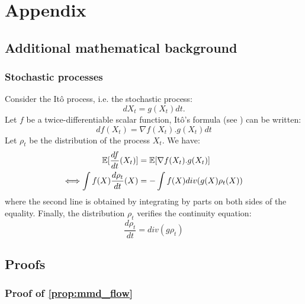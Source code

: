 \section{Appendix}\label{sec:appendix}

\subsection{Additional mathematical background}



\subsubsection{Stochastic processes}\label{sec:ito_stochastic}

Consider the Itô process, i.e. the stochastic process:
\begin{equation}
dX_t=g(X_t)dt.
\end{equation}
Let $f$ be a twice-differentiable scalar function, Itô's formula (see \cite{ito1951stochastic}) can be written:
\begin{equation}
df(X_t)=\nabla f(X_t).g(X_t)dt
\end{equation}
Let $\rho_t$ be the distribution of the process $X_t$. We have:
\begin{align}
{{\mathbb E}}[\frac{df}{dt}(X_t)]&= {{\mathbb E}}[\nabla f(X_t).g(X_t)]\\
\Longleftrightarrow \int f(X) \frac{d \rho_t}{dt}(X)&=-\int f(X)div(g(X)\rho_t(X))
\end{align}
where the second line is obtained by integrating by parts on both sides of the equality. Finally, the distribution $\rho_t$ verifies the continuity equation: 
\begin{equation}
\frac{d\rho_t}{dt}=div(g\rho_t)
\end{equation}


\subsection{Proofs}

\subsubsection{Proof of \cref{prop:mmd_flow}}

